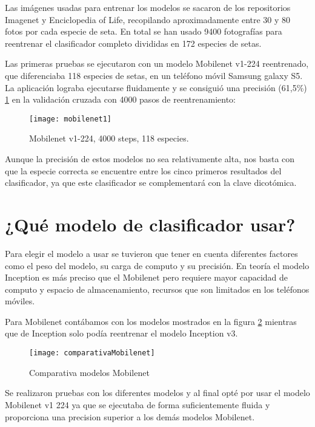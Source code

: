 Las imágenes usadas para entrenar los modelos se sacaron de los repositorios Imagenet y Enciclopedia of Life, recopilando aproximadamente entre 30 y 80 fotos por cada especie de seta. En total se han usado 9400 fotografías para reentrenar el clasificador completo divididas en 172 especies de setas.

Las primeras pruebas se ejecutaron con un modelo Mobilenet v1-224 reentrenado, que diferenciaba 118 especies de setas, en un teléfono móvil Samsung galaxy S5. La aplicación lograba ejecutarse fluidamente y se consiguió una precisión (61,5\%) \ref{figMobilenet1} en la validación cruzada con 4000 pasos de reentrenamiento:

\begin{figure}[h]
    \begin{center}%
        \begin{center}%
          \texttt{[image: mobilenet1]}%
          \caption{Mobilenet v1-224, 4000 steps, 118 especies.}%
          \label{figMobilenet1}%
        \end{center}%
  	\end{center}%
\end{figure}%

Aunque la precisión de estos modelos no sea relativamente alta, nos basta con que la especie correcta se encuentre entre los cinco primeros resultados del clasificador, ya que este clasificador se complementará con la clave dicotómica.

\section{¿Qué modelo de clasificador usar?}

Para elegir el modelo a usar se tuvieron que tener en cuenta diferentes factores como el peso del modelo, su carga de computo y su precisión. En teoría el modelo Inception es más preciso que el Mobilenet pero requiere mayor capacidad de computo y espacio de almacenamiento, recursos que son limitados en los teléfonos móviles.

Para Mobilenet contábamos con los modelos mostrados en la figura \ref{figComparativaMobilenet} mientras que de Inception solo podía reentrenar el modelo Inception v3.

\begin{figure}[h]
    \begin{center}%
        \begin{center}%
          \texttt{[image: comparativaMobilenet]}%
          \caption{Comparativa modelos Mobilenet}%
          \label{figComparativaMobilenet}%
        \end{center}%
  	\end{center}%
\end{figure}%
\newpage
Se realizaron pruebas con los diferentes modelos y al final opté por usar el modelo Mobilenet v1 224 ya que se ejecutaba de forma suficientemente fluida y proporciona una precision superior a los demás modelos Mobilenet. 

